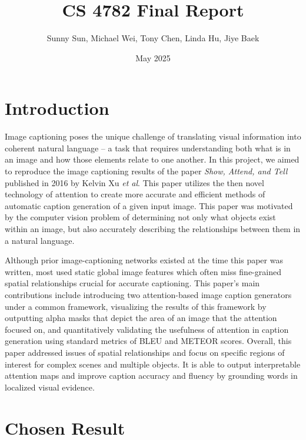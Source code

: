 \documentclass{article}
\title{\vspace{0cm}\myfont CS 4782 Final Report}
\author{Sunny Sun, Michael Wei, Tony Chen, Linda Hu, Jiye Baek}
\date{May 2025}
\begin{document}
\maketitle

\section{Introduction}


Image captioning poses the unique challenge of translating visual information into coherent natural language -- a task that requires understanding both what is in an image and how those elements relate to one another. In this project, we aimed to reproduce the image captioning results of the paper \textit{Show, Attend, and Tell} published in 2016 by Kelvin Xu \textit{et al}. This paper utilizes the then novel technology of attention to create more accurate and efficient methods of automatic caption generation of a given input image. This paper was motivated by the computer vision problem of determining not only what objects exist within an image, but also accurately describing the relationships between them in a natural language.

Although prior image-captioning networks existed at the time this paper was written, most used static global image features which often miss fine-grained spatial relationships crucial for accurate captioning. This paper's main contributions include introducing two attention-based image caption generators under a common framework, visualizing the results of this framework by outputting alpha masks that depict the area of an image that the attention focused on, and quantitatively validating the usefulness of attention in caption generation using standard metrics of BLEU and METEOR scores. Overall, this paper addressed issues of spatial relationships and focus on specific regions of interest for complex scenes and multiple objects. It is able to output interpretable attention maps and improve caption accuracy and fluency by grounding words in localized visual evidence.

\section{Chosen Result}

\end{document}
